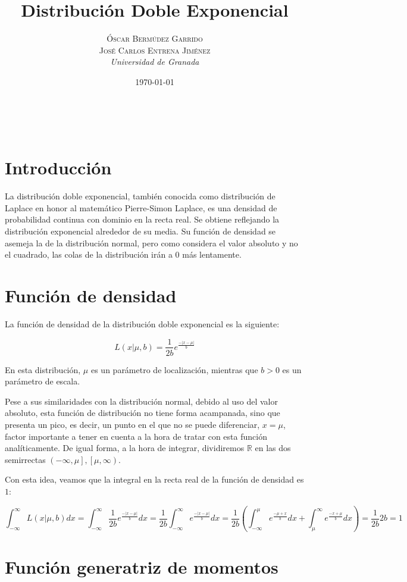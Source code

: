 \documentclass[a4paper, 10pt]{article} %
\title{\textbf{Distribución Doble Exponencial}\\ %
\vspace{20 pt}
} %
\author{\textsc{Óscar Bermúdez Garrido\\José Carlos Entrena Jiménez} %
\\{\textit{Universidad de Granada}}} %
\date{\today} %
\makeatletter
\renewcommand{\maketitle}{ %
\begin{center} %
{\Huge\@title} %
\end{center}

\vspace{20pt} %

\begin{flushright} %
{\large\@author} %
\\\@date %

\vspace{40pt} %
\end{flushright}
\renewcommand{\baselinestretch}{0.5}

}
\makeatother
\begin{document}
\maketitle
\tableofcontents
\pagebreak

\section{Introducción}

La distribución doble exponencial, también conocida como distribución de Laplace en honor al matemático
Pierre-Simon Laplace, es una densidad de probabilidad continua con dominio en la recta real. Se obtiene
reflejando la distribución exponencial alrededor de su media. Su función de densidad se asemeja la de la
distribución normal, pero como considera el valor absoluto y no el cuadrado, las colas de la distribución
irán a $0$ más lentamente. 

\section{Función de densidad}

La función de densidad de la distribución doble exponencial es la siguiente: 

$$L(x|\mu, b)=\frac{1}{2b}e^\frac{-|x-\mu|}{b}$$

En esta distribución, $\mu$ es un parámetro de localización, mientras que $b > 0$ es un parámetro de escala. 

Pese a sus similaridades con la distribución normal, debido al uso del valor absoluto, esta función de
distribución no tiene forma acampanada, sino que presenta un pico, es decir, un punto en el que no se puede
diferenciar, $x = \mu$, factor importante a tener en cuenta a la hora de tratar con esta función analíticamente.
De igual forma, a la hora de integrar, dividiremos $\mathbb{R}$ en las dos semirrectas $\left(-\infty, \mu\right],
\left[\mu, \infty\right)$.

Con esta idea, veamos que la integral en la recta real de la función de densidad es $1$: 

$$\int_{-\infty}^{\infty} L(x|\mu, b)dx = \int_{-\infty}^{\infty} \frac{1}{2b}e^\frac{-|x-\mu|}{b}dx =
\frac{1}{2b}\int_{-\infty}^{\infty}e^\frac{-|x-\mu|}{b}dx = 
\frac{1}{2b}\left( \int_{-\infty}^{\mu}e^\frac{-\mu+x}{b}dx + \int_{\mu}^{\infty}e^\frac{-x+\mu}{b}dx \right) =
\frac{1}{2b}2b = 1$$
 

\section{Función generatriz de momentos}
\end{document}
